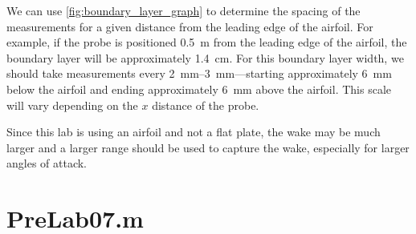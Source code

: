 We can use \autoref{fig:boundary_layer_graph} to determine the spacing of the measurements for a given distance from the leading edge of the airfoil. For example, if the probe is positioned \qty{0.5}{\meter} from the leading edge of the airfoil, the boundary layer will be approximately \qty{1.4}{\centi\meter}. For this boundary layer width, we should take measurements every \qtyrange{2}{3}{\milli\meter}—starting approximately \qty{6}{\milli\meter} below the airfoil and ending approximately \qty{6}{\milli\meter} above the airfoil. This scale will vary depending on the $x$ distance of the probe.

Since this lab is using an airfoil and not a flat plate, the wake may be much larger and a larger range should be used to capture the wake, especially for larger angles of attack.

\section{PreLab07.m} \label{sec:code}

\inputminted{matlab}{Code/PreLab07.m}\label{listing:prelab_script}






